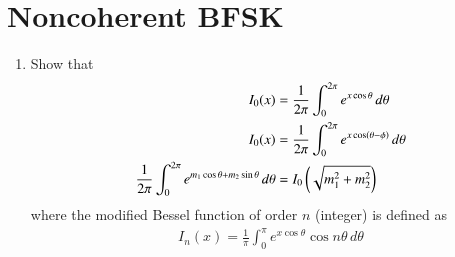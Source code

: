 \documentclass[journal,12pt,twocolumn]{IEEEtran}
\renewcommand\thesection{\arabic{section}}
\begin{document}
\section{Noncoherent BFSK}
\begin{enumerate}[label=\thesection.\arabic*
,ref=\thesection.\theenumi]

\item
Show that
%
\begin{align}
I_{0}(x) &= \frac{1}{2\pi}\int_{0}^{2\pi}e^{x\cos\theta}\,d\theta \\
I_{0}(x) &= \frac{1}{2\pi}\int_{0}^{2\pi}e^{x\cos\left(\theta-\phi\right)}\,d\theta \\
\frac{1}{2\pi}\int_{0}^{2\pi}e^{m_1\cos\theta + m_2\sin\theta}\,d\theta &= I_0\left(\sqrt{m_1^2+m_2^2}\right) 
\end{align}
%
where the modified Bessel function of order $n$ (integer) is defined as 
%
\begin{align}
I_{n}(x) = \frac{1}{\pi}\int_{0}^{\pi}e^{x\cos\theta}\cos n\theta\,d\theta
\end{align}


\end{enumerate}
\end{document}
